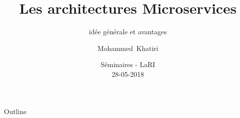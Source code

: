 \documentclass{beamer}
\title{Les architectures Microservices}
\subtitle{id\'ee g\'en\'erale et avantages}
\author{Mohammed~Khatiri\inst{2}\inst{1}}
\institute[Univ. Grenoble Alpes, CNRS, Inria, LIG] %
{
    \inst{1}%
  University Mohammed First\\
  Faculty of Sciences, LaRI, Morocco\\
  \textcolor{red}{Professeur El Mostafa DAOUDI}
  \and
  \inst{2}%
  Univ. Grenoble Alpes\\
  CNRS, Inria, LIG, France \\
  \textcolor{red}{Professeur Denis trystram}}
\date{Séminaires - LaRI \\ 28-05-2018 }
\begin{document}
\begin{frame}
    \titlepage
\end{frame}

\begin{frame}{Outline}
    \tableofcontents
\end{frame}



%
\end{document}
